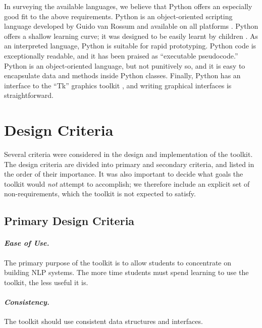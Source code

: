 \documentclass[11pt]{article}
\begin{document}
In surveying the available languages, we believe that Python offers an
especially good fit to the above requirements.  Python is an
object-oriented scripting language developed by Guido van Rossum
and available on all platforms \cite{python}.  Python offers a
shallow learning curve; it was designed to be easily learnt by
children \cite{rossum99}.  As an interpreted language, Python is
suitable for rapid prototyping.  Python code is exceptionally
readable, and it has been praised as ``executable pseudocode.''
Python is an object-oriented language, but not punitively so, and it
is easy to encapsulate data and methods inside Python classes.
Finally, Python has an interface to the ``Tk'' graphics toolkit
\cite{tkinter}, and writing graphical interfaces is straightforward.

\section{Design Criteria}
\label{sec:criteria}

Several criteria were considered in the design and implementation of
the toolkit.  The design criteria are divided into primary and
secondary criteria, and listed in the order of their importance.  It
was also important to decide what goals the toolkit would \emph{not}
attempt to accomplish; we therefore include an explicit set of
non-requirements, which the toolkit is not expected to satisfy.

\subsection{Primary Design Criteria}

\paragraph{\textit{Ease of Use.}} The primary purpose of the toolkit is
to allow students to concentrate on building NLP systems.  The more
time students must spend learning to use the toolkit, the less useful
it is.

\paragraph{\textit{Consistency.}} The toolkit should use consistent data
structures and interfaces.
\end{document}
